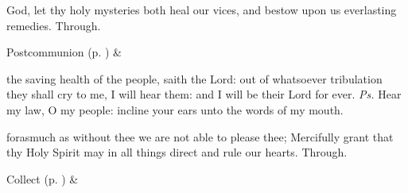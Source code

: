 
\postcommunion
{} God, let thy holy mysteries both heal our vices, and bestow upon us everlasting remedies. Through.


\begin{rubric}
     Postcommunion  (p. \pageref{SPSaints}) \&  
\end{rubric}


\clearpage
{}


\introit
{} the saving health of the people, saith the Lord: out of whatsoever tribulation they shall cry to me, I will hear them: and I will be their Lord for ever. \textit{Ps.} Hear my law, O my people: incline your ears unto the words of my mouth.

\collect
{} forasmuch as without thee we are not able to please thee; Mercifully grant that thy Holy Spirit may in all things direct and rule our hearts. Through.
\begin{rubric}
     Collect  (p. \pageref{SPSaints}) \&  
\end{rubric}


